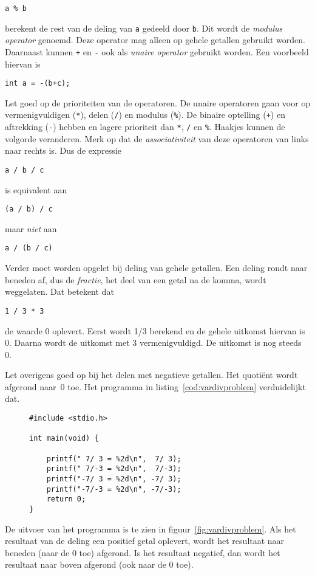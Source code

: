 \hspace*{1em}\texttt{a \% b}

berekent de rest van de deling van \texttt{a} gedeeld door \texttt{b}. Dit wordt de \textsl{modulus operator} genoemd. Deze operator mag alleen op gehele getallen gebruikt worden. Daarnaast kunnen \texttt{+} en \texttt{-} ook als \textsl{unaire operator} gebruikt worden. Een voorbeeld hiervan is

\hspace*{1em}\texttt{int a = -(b+c);}

Let goed op de prioriteiten van de operatoren. De unaire operatoren gaan voor op vermenigvuldigen (\texttt{*}), delen (\texttt{/}) en modulus (\texttt{\%}). De binaire optelling (\texttt{+}) en aftrekking (\texttt{-}) hebben en lagere prioriteit dan \texttt{*}, \texttt{/} en \texttt{\%}. Haakjes kunnen de volgorde veranderen. Merk op dat de \textsl{associativiteit} van deze operatoren van links naar rechts is. Dus de expressie

\hspace*{1em}\texttt{a / b / c}

is equivalent aan

\hspace*{1em}\texttt{(a / b) / c}
 
maar \textsl{niet} aan

\hspace*{1em}\texttt{a / (b / c)}

Verder moet worden opgelet bij deling van gehele getallen. Een deling rondt naar beneden af, dus de \textsl{fractie}, het deel van een getal na de komma, wordt weggelaten. Dat betekent dat

\hspace*{1em}\texttt{1 / 3 * 3}

de waarde 0 oplevert. Eerst wordt 1/3 berekend en de gehele uitkomst hiervan is 0. Daarna wordt de uitkomst met 3 vermenigvuldigd. De uitkomst is nog steeds 0.

Let overigens goed op bij het delen met negatieve getallen. Het quotiënt wordt afgerond naar~0 toe. Het programma in listing~\ref{cod:vardivproblem} verduidelijkt dat.
%
\begin{figure}[!ht]
\begin{lstlisting}[caption=Delen van positieve en negatieve getallen.,label=cod:vardivproblem]
#include <stdio.h>

int main(void) {

	printf(" 7/ 3 = %2d\n",  7/ 3);
	printf(" 7/-3 = %2d\n",  7/-3);
	printf("-7/ 3 = %2d\n", -7/ 3);
	printf("-7/-3 = %2d\n", -7/-3);
	return 0;
}
\end{lstlisting}
\end{figure}
%
De uitvoer van het programma is te zien in figuur~\ref{fig:vardivproblem}.
Als het resultaat van de deling een positief getal oplevert, wordt het resultaat naar beneden (naar de 0 toe) afgerond. Is het resultaat negatief, dan wordt het resultaat naar boven afgerond (ook naar de 0 toe).

